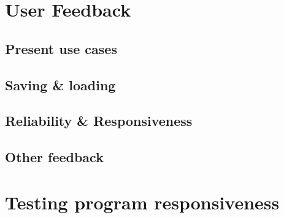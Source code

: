 \section{User Feedback} %
\label{sec:user_feedback}


	\subsection{Present use cases} %
	\label{sub:present_use_cases}



	\subsection{Saving \& loading} %
	\label{sub:saving_and_loading}
	

	\subsection{Reliability \& Responsiveness} %
	\label{sub:reliability_and_responsiveness}
	

	\subsection{Other feedback} %
	\label{sub:other_feedback}
	
	

\section{Testing program responsiveness} %
\label{sec:testing_program_responsiveness}

